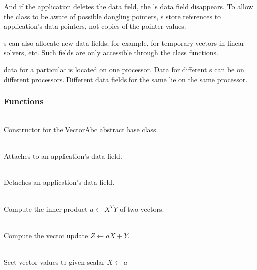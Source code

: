 \documentclass[11pt]{article}
\begin{document}
   And if the application deletes the data field, the 's
   data field disappears.  To allow the  class to be
   aware of possible dangling pointers, s store
   references to application's data pointers, not copies of the
   pointer values.

   s can also allocate new data fields; for example, for
   temporary vectors in linear solvers, etc.  Such fields are only
   accessible through the  class functions.

    data for a particular  is located on one
   processor.  Data for different s can be on different
   processors.  Different data fields for the same  lie on the
   same processor.

   \umlVector

\subsubsection{ Functions}

     \\
    Constructor for the VectorAbc abstract base class.

     \\
    Attaches to an application's data field.

     \\
    Detaches an application's data field.

     \\
    Compute the inner-product $a \leftarrow X^T Y$ of two vectors.

     \\
    Compute the vector update $Z \leftarrow a X + Y$. 

     \\
    Sect vector values to given scalar $X \leftarrow a$.
\end{document}

